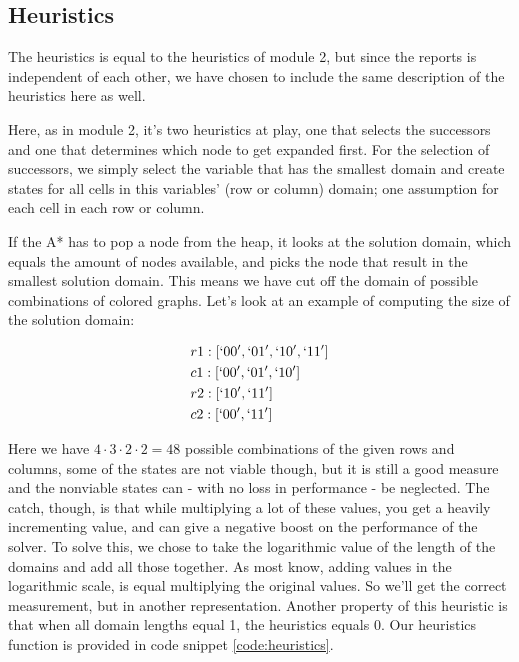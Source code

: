\subsection{Heuristics}
The heuristics is equal to the heuristics of module 2, but since the reports is independent of each other, we have chosen to include the same description of the heuristics here as well.

Here, as in module 2, it's two heuristics at play, one that selects the successors and one that determines which node to get expanded first. For the selection of successors, we simply select the variable that has the smallest domain and create states for all cells in this variables' (row or column) domain; one assumption for each cell in each row or column.

If the A* has to pop a node from the heap, it looks at the solution domain, which equals the amount of nodes available, and picks the node that result in the smallest solution domain. This means we have cut off the domain of possible combinations of colored graphs. Let's look at an example of computing the size of the solution domain:

\begin{align*}
	&r1: [`00',`01',`10',`11']\\
	&c1: [`00',`01',`10']\\
	&r2: [`10',`11']\\
	&c2: [`00',`11']
\end{align*}

Here we have \(4 \cdot 3 \cdot 2 \cdot 2 = 48\) possible combinations of the given rows and columns, some of the states are not viable though, but it is still a good measure and the nonviable states can - with no loss in performance - be neglected. The catch, though, is that while multiplying a lot of these values, you get a heavily incrementing value, and can give a negative boost on the performance of the solver. To solve this, we chose to take the logarithmic value of the length of the domains and add all those together. As most know, adding values in the logarithmic scale, is equal multiplying the original values. So we'll get the correct measurement, but in another representation. Another property of this heuristic is that when all domain lengths equal 1, the heuristics equals 0. Our heuristics function is provided in code snippet \ref{code:heuristics}.



